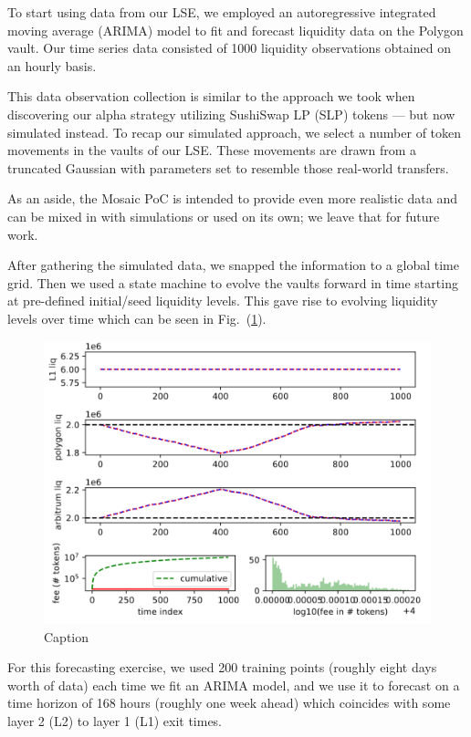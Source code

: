 To start using data from our LSE, we employed an autoregressive integrated moving average (ARIMA) model to fit and forecast liquidity data on the Polygon vault. Our time series data consisted of 1000 liquidity observations obtained on an hourly basis.

This data observation collection is similar to the approach we took when discovering our alpha strategy utilizing SushiSwap LP (SLP) tokens — but now simulated instead. To recap our simulated approach, we select a number of token movements in the vaults of our LSE. These movements are drawn from a truncated Gaussian with parameters set to resemble those real-world transfers.

As an aside, the Mosaic PoC is intended to provide even more realistic data and can be mixed in with simulations or used on its own; we leave that for future work.

After gathering the simulated data, we snapped the information to a global time grid. Then we used a state machine to evolve the vaults forward in time starting at pre-defined initial/seed liquidity levels. This gave rise to evolving liquidity levels over time which can be seen in Fig.~(\ref{fig:forecast1}).
%
\begin{figure}
    \centering
    \includegraphics[width=15cm]{images/mosaic/forecast1.png}
    \caption{Caption}
    \label{fig:forecast1}
\end{figure}
%
For this forecasting exercise, we used 200 training points (roughly eight days worth of data) each time we fit an ARIMA model, and we use it to forecast on a time horizon of 168 hours (roughly one week ahead) which coincides with some layer 2 (L2) to layer 1 (L1) exit times.

